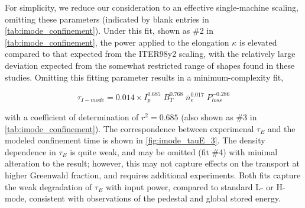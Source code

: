 For simplicity, we reduce our consideration to an effective single-machine scaling, omitting these parameters (indicated by blank entries in \cref{tab:imode_confinement}).  Under this fit, shown as \#2 in \cref{tab:imode_confinement}, the power applied to the elongation $\kappa$ is elevated compared to that expected from the ITER98y2 scaling, with the relatively large deviation expected from the somewhat restricted range of shapes found in these studies.  Omitting this fitting parameter results in a minimum-complexity fit,

\begin{equation}\label{eq:tauE_fit_3}
 \tau_{I-mode} = 0.014 \times I_p^{0.685} \; B_T^{0.768} \; \overline{n}_e^{0.017} \; P_{loss}^{-0.286}
\end{equation}

\noindent with a coefficient of determination of $r^2 = 0.685$ (also shown as \#3 in \cref{tab:imode_confinement}).  The correspondence between experimenal $\tau_E$ and the modeled confinement time is shown in \cref{fig:imode_tauE_3}.  The density dependence in $\tau_E$ is quite weak, and may be omitted (fit \#4) with minimal alteration to the result; however, this may not capture effects on the transport at higher Greenwald fraction, and requires additional experiments.  Both fits capture the weak degradation of $\tau_E$ with input power, compared to standard L- or H-mode, consistent with observations of the pedestal and global stored energy.

